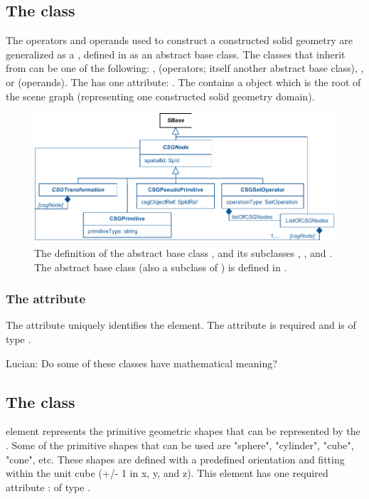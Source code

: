\subsection{The  class}
\label{CSGNode-class}
The operators and operands used to construct a constructed solid geometry are generalized as a \CSGNode, defined in  as an abstract base class. The classes that inherit from \CSGNode can be one of the following: \CSGSetOperator, \CSGTransformation (operators; itself another abstract base class), \CSGPrimitive, or \CSGPseudoPrimitive (operands). The \CSGNode has one attribute: . The \CSGObject contains a \CSGNode object which is the root of the \CSGObject scene graph (representing one constructed solid geometry domain).

\begin{figure}[ht]
  \includegraphics{figs/CSGNode-uml}
  \caption{The definition of the abstract base class \CSGNode, and its subclasses \CSGPrimitive, \CSGPseudoPrimitive, and \CSGSetOperator.  The abstract base class \CSGTransformation (also a subclass of \CSGNode) is defined in .}
  \label{CSGNode-uml}
  \label{CSGPrimitive-uml}
  \label{CSGPseudoPrimitive-uml}
  \label{CSGSetOperator-uml}
  \label{ListOfCSGNodes-uml}
\end{figure}

\subsubsection{The  attribute}
The  attribute uniquely identifies the \CSGNode element. The attribute is required and is of type .

{\color{red} Lucian: \notice Do some of these classes have mathematical meaning?}


\subsection{The  class}
\label{CSGPrimitive-class}
\CSGPrimitive element represents the primitive geometric shapes that can be represented by the \CSGeometry. Some of the primitive shapes that can be used are "sphere", "cylinder", "cube", "cone", etc. These shapes are defined with a predefined orientation and fitting within the unit cube (+/- 1 in x, y, and z). This element has one required attribute :  of type .

